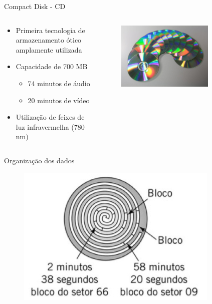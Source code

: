 \documentclass[aspectratio=169,
				xcolor=table]{beamer}
\begin{document}
	\begin{frame}{Compact Disk - CD}
		\begin{columns}
			\begin{column}{0.6\textwidth}
		\begin{itemize}
			\item Primeira tecnologia de armazenamento ótico amplamente utilizada
			\vspace{1em}
			\item Capacidade de 700 MB
			\begin{itemize}
				\item 74 minutos de áudio
				\item 20 minutos de vídeo
			\end{itemize}
			\vspace{1em}
			\item Utilização de feixes de luz infravermelha (780 nm)
		\end{itemize}
			\end{column}
			\begin{column}{0.4\textwidth}
		\begin{figure}[hbtp]
		\centering
		\includegraphics[width=0.75\textwidth, keepaspectratio]{../figs/cap08/cd}
		\end{figure}	
			\end{column}
		\end{columns}
	\end{frame}
	
	\begin{frame}{Organização dos dados}
		\begin{figure}[hbtp]
		\centering
		\includegraphics[height=0.85\textheight, keepaspectratio]{../figs/cap08/cdblock}
		\end{figure}		
	\end{frame}
	
\end{document}
